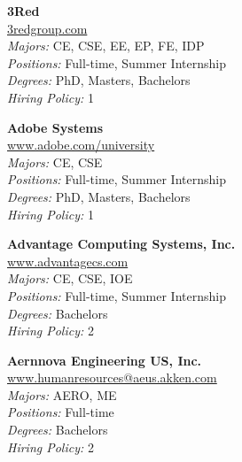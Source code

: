 \documentclass{article}
\begin{document}
\begin{center}
\begin{multicols}{3}
\end{multicols}\end{center}\newpage{}
\begin{center}\begin{multicols}{3}
\begin{minipage}{.9\columnwidth}{\Large\bf 3Red }\\
	\url{3redgroup.com}\\
	\emph{Majors:} CE, CSE, EE, EP, FE, IDP\\
	\emph{Positions:} Full-time, Summer Internship\\
	\emph{Degrees:} PhD, Masters, Bachelors\\
	\emph{Hiring Policy:} 1\\
\end{minipage}
 
\begin{minipage}{.9\columnwidth}{\Large\bf Adobe Systems }\\
	\url{www.adobe.com/university}\\
	\emph{Majors:} CE, CSE\\
	\emph{Positions:} Full-time, Summer Internship\\
	\emph{Degrees:} PhD, Masters, Bachelors\\
	\emph{Hiring Policy:} 1\\
\end{minipage}
 
\begin{minipage}{.9\columnwidth}{\Large\bf Advantage Computing Systems, Inc. }\\
	\url{www.advantagecs.com}\\
	\emph{Majors:} CE, CSE, IOE\\
	\emph{Positions:} Full-time, Summer Internship\\
	\emph{Degrees:} Bachelors\\
	\emph{Hiring Policy:} 2\\
\end{minipage}
 
\begin{minipage}{.9\columnwidth}{\Large\bf Aernnova Engineering US, Inc. }\\
	\url{www.humanresources@aeus.akken.com}\\
	\emph{Majors:} AERO, ME\\
	\emph{Positions:} Full-time\\
	\emph{Degrees:} Bachelors\\
	\emph{Hiring Policy:} 2\\
\end{minipage}
 

\end{multicols}
\end{center}
\end{document}
